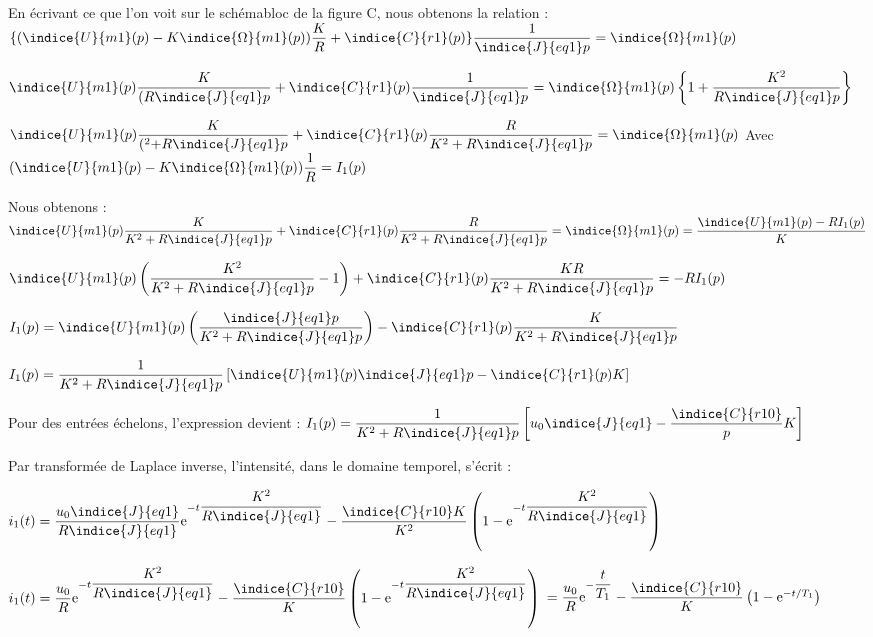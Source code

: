 \ifprof
\begin{corrige}
En écrivant ce que l’on voit sur le schémabloc de la figure C, nous obtenons la relation :
$\{(\indice{U}{m1}  (p)-K  \indice{\Omega}{m1}  (p)) \dfrac{K}{R}+\indice{C}{r1} (p)\}  \dfrac{1}{\indice{J}{eq1}  p}=\indice{\Omega}{m1} (p)$

$\indice{U}{m1}  (p)   \dfrac{K}{(R  \indice{J}{eq1}   p}+\indice{C}{r1} (p) \dfrac{1}{\indice{J}{eq1} p}=\indice{\Omega}{m1} (p) \left\{1+\dfrac{K^2}{R \indice{J}{eq1}  p}\right\}$

$\indice{U}{m1}  (p)  \dfrac{K}{(^2+R \indice{J}{eq1}   p}+\indice{C}{r1} (p)   \dfrac{R}{K^2+R  \indice{J}{eq1}  p}=\indice{\Omega}{m1} (p)$
    Avec $(\indice{U}{m1}  (p)-K  \indice{\Omega}{m1}  (p))  \dfrac{1}{R}=I_1 (p)$

Nous obtenons : 
$\indice{U}{m1}  (p) \dfrac{K}{K^2+R  \indice{J}{eq1}  p}+\indice{C}{r1} (p)\dfrac{R}{K^2+R \indice{J}{eq1}  p}=\indice{\Omega}{m1} (p)=\dfrac{\indice{U}{m1}  (p)-R I_1 (p)}{K}$

$\indice{U}{m1}  (p)  \left(\dfrac{K^2}{K^2+R  \indice{J}{eq1}   p }-1\right)+\indice{C}{r1} (p) \dfrac{KR}{K^2+R \indice{J}{eq1}  p}=-R  I_1 (p)$

$I_1 (p)=\indice{U}{m1}  (p) \left( \dfrac{\indice{J}{eq1}p}{K^2+R  \indice{J}{eq1}  p}\right)-\indice{C}{r1} (p) \dfrac{K}{K^2+R \indice{J}{eq1}p}$

$I_1 (p)=\dfrac{1}{K^2+R \indice{J}{eq1}  p} \left[\indice{U}{m1}  (p)  \indice{J}{eq1}  p-\indice{C}{r1} (p) K\right]$

Pour des entrées échelons, l’expression devient : $I_1 (p)=\dfrac{1}{K^2+R \indice{J}{eq1}  p}  \left[u_0  \indice{J}{eq1}-\dfrac{\indice{C}{r10}}{p}  K\right]$

Par transformée de Laplace inverse, l’intensité, dans le domaine temporel, s’écrit :

$i_1 (t)=\dfrac{u_0  \indice{J}{eq1}}{R  \indice{J}{eq1} } \text{e}^{-t  \dfrac{K^2}{R  \indice{J}{eq1} }}-\dfrac{\indice{C}{r10}  K}{K^2}    \left(1-\text{e}^{-t  \dfrac{K^2}{R  \indice{J}{eq1}}} \right)$

$i_1 (t)=\dfrac{u_0}{R} \text{e}^{-t \dfrac{K^2}{R  \indice{J}{eq1}}}-\dfrac{\indice{C}{r10}}{K}   \left(1- \text{e}^{-t\dfrac{K^2}{R  \indice{J}{eq1} }}\right)$
$=\dfrac{u_0}{R}  \text{e}^{-\dfrac{t}{T_1}}-\dfrac{\indice{C}{r10}}{K}  \left(1- \text{e}^{-t /T_1}\right )$

%
%
\end{corrige}
\else
\fi



